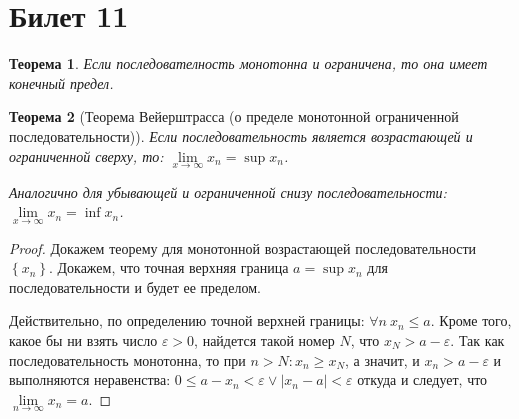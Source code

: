 \documentclass[a4paper,12pt]{article}
\newtheorem*{ther}{Теорема}
\newcommand{\eps}{\varepsilon}
\begin{document}
    \section*{Билет 11}

    \begin{ther}
        Если последователность монотонна и ограничена, то она имеет конечный предел.
    \end{ther}

    \begin{ther}[Теорема Вейерштрасса (о пределе монотонной ограниченной последовательности)]

        Если последовательность является возрастающей и ограниченной сверху, то: $\lim\limits_{x \to \infty} x_n = \sup {x_n}$.

        Аналогично для убывающей и ограниченной снизу последовательности: $\lim\limits_{x \to \infty} x_n = \inf {x_n}$.
    \end{ther}

    \begin{proof}
        Докажем теорему для монотонной возрастающей последовательности $\left\{x_n\right\}$. Докажем, что точная верхняя граница $a = \sup{x_n}$ для последовательности и будет ее пределом.

        Действительно, по определению точной верхней границы: 
        $\forall n\ x_n \leq a$.
        Кроме того, какое бы ни взять число $\eps > 0$, найдется такой номер $N$, что $x_N > a - \eps$.
        Так как последовательность монотонна, то при $n > N: x_n \geq x_N$, а значит, и $x_n > a - \eps$ и выполняются неравенства: $0 \leq a - x_n < \eps \vee \left | x_n - a \right | <\eps$
         откуда и следует, что $\lim\limits_{n \to \infty} x_n = a$.
    \end{proof}
\end{document}
